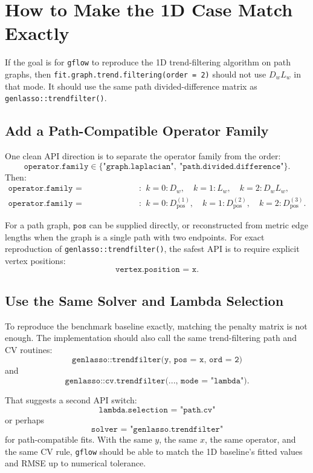 \documentclass[11pt]{article}
\begin{document}
\section{How to Make the 1D Case Match Exactly}

If the goal is for \texttt{gflow} to reproduce the 1D trend-filtering
algorithm on path graphs, then \texttt{fit.graph.trend.filtering(order = 2)}
should not use \(D_wL_w\) in that mode.  It should use the same path
divided-difference matrix as \texttt{genlasso::trendfilter()}.

\subsection{Add a Path-Compatible Operator Family}

One clean API direction is to separate the operator family from the order:
\[
\texttt{operator.family}
\in
\{\texttt{"graph.laplacian"},\ \texttt{"path.divided.difference"}\}.
\]
Then:
\[
\begin{array}{lll}
\texttt{operator.family = "graph.laplacian"}:
& k=0:D_w,\quad k=1:L_w,\quad k=2:D_wL_w,\\[3pt]
\texttt{operator.family = "path.divided.difference"}:
& k=0:D^{(1)}_{\mathrm{pos}},\quad
  k=1:D^{(2)}_{\mathrm{pos}},\quad
  k=2:D^{(3)}_{\mathrm{pos}}.
\end{array}
\]

For a path graph, \(\texttt{pos}\) can be supplied directly, or reconstructed
from metric edge lengths when the graph is a single path with two endpoints.
For exact reproduction of \texttt{genlasso::trendfilter()}, the safest API is
to require explicit vertex positions:
\[
  \texttt{vertex.position = x}.
\]

\subsection{Use the Same Solver and Lambda Selection}

To reproduce the benchmark baseline exactly, matching the penalty matrix is not
enough.  The implementation should also call the same trend-filtering path and
CV routines:
\[
  \texttt{genlasso::trendfilter(y,\ pos = x,\ ord = 2)}
\]
and
\[
  \texttt{genlasso::cv.trendfilter(...,\ mode = "lambda")}.
\]

That suggests a second API switch:
\[
  \texttt{lambda.selection = "path.cv"}
\]
or perhaps
\[
  \texttt{solver = "genlasso.trendfilter"}
\]
for path-compatible fits.  With the same \(y\), the same \(x\), the same
operator, and the same CV rule, \texttt{gflow} should be able to match the
1D baseline's fitted values and RMSE up to numerical tolerance.
\end{document}
